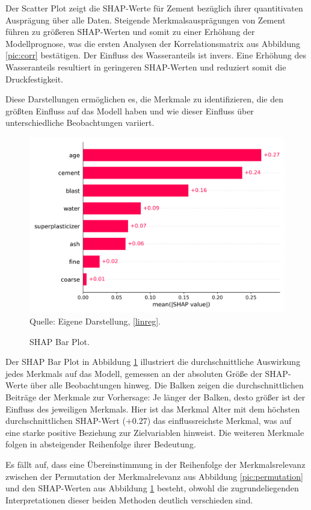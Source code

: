 Der Scatter Plot zeigt die SHAP-Werte für Zement bezüglich ihrer quantitivaten Ausprägung über alle 
Daten. Steigende Merkmalsausprägungen von Zement führen zu größeren SHAP-Werten und somit zu einer Erhöhung der 
Modellprognose, was die ersten Analysen der Korrelationsmatrix aus Abbildung \ref{pic:corr} bestätigen. Der Einfluss des Wasseranteils
ist invers. Eine Erhöhung des Wasseranteils resultiert in geringeren SHAP-Werten und reduziert somit die 
Druckfestigkeit. 

Diese Darstellungen ermöglichen es, die Merkmale zu identifizieren, 
die den größten Einfluss auf das Modell haben und wie dieser Einfluss über 
unterschiedliche Beobachtungen variiert.

\begin{figure}[!h]
    \caption{SHAP Bar Plot.}
    \includegraphics[width=1\textwidth]{../scripts/images/shap_bar_plot.png}
    Quelle: Eigene Darstellung, \ref{linreg}.
    \label{pic:shap_bar}
\end{figure}

Der SHAP Bar Plot in Abbildung \ref{pic:shap_bar} illustriert die durchschnittliche 
Auswirkung jedes Merkmals auf das Modell, gemessen an der absoluten Größe der SHAP-Werte 
über alle Beobachtungen hinweg. Die Balken zeigen die durchschnittlichen Beiträge der 
Merkmale zur Vorhersage: Je länger der Balken, desto größer ist der Einfluss des jeweiligen Merkmals. 
Hier ist das Merkmal Alter mit dem höchsten durchschnittlichen SHAP-Wert ($+0.27$) das einflussreichste 
Merkmal, was auf eine starke positive Beziehung zur Zielvariablen hinweist. Die weiteren Merkmale 
folgen in absteigender Reihenfolge ihrer Bedeutung.

Es fällt auf, dass eine Übereinstimmung in der Reihenfolge der Merkmalsrelevanz zwischen 
der Permutation der Merkmalrelevanz aus Abbildung \ref{pic:permutation} und den SHAP-Werten aus Abbildung \ref{pic:shap_bar}
besteht, obwohl die zugrundeliegenden Interpretationen dieser beiden Methoden deutlich verschieden sind. 

